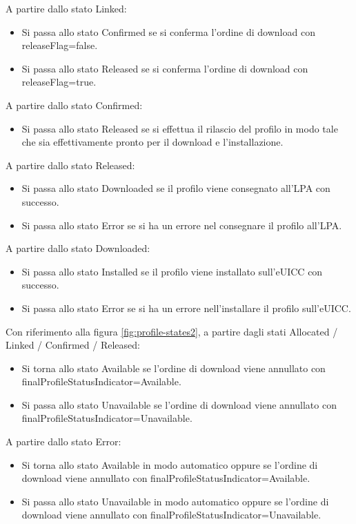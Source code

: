 \documentclass[10pt, twoside, openany]{book}
\begin{document}
A partire dallo stato Linked:
\begin{itemize}
\item Si passa allo stato Confirmed se si conferma l'ordine di download con releaseFlag=false.
\item Si passa allo stato Released se si conferma l'ordine di download con releaseFlag=true.
\end{itemize}
A partire dallo stato Confirmed:
\begin{itemize}
\item Si passa allo stato Released se si effettua il rilascio del profilo in modo tale che sia effettivamente pronto per il download e l'installazione.
\end{itemize}
A partire dallo stato Released:
\begin{itemize}
\item Si passa allo stato Downloaded se il profilo viene consegnato all'LPA con successo.
\item Si passa allo stato Error se si ha un errore nel consegnare il profilo all'LPA.
\end{itemize}
A partire dallo stato Downloaded:
\begin{itemize}
\item Si passa allo stato Installed se il profilo viene installato sull'eUICC con successo.
\item Si passa allo stato Error se si ha un errore nell'installare il profilo sull'eUICC.
\end{itemize}
Con riferimento alla figura \ref{fig:profile-states2}, a partire dagli stati Allocated / Linked / Confirmed / Released:
\begin{itemize}
\item Si torna allo stato Available se l'ordine di download viene annullato con finalProfileStatusIndicator=Available.
\item Si passa allo stato Unavailable se l'ordine di download viene annullato con finalProfileStatusIndicator=Unavailable.
\end{itemize}
A partire dallo stato Error:
\begin{itemize}
\item Si torna allo stato Available in modo automatico oppure se l'ordine di download viene annullato con finalProfileStatusIndicator=Available.
\item Si passa allo stato Unavailable in modo automatico oppure se l'ordine di download viene annullato con finalProfileStatusIndicator=Unavailable.
\end{itemize}
\end{document}
